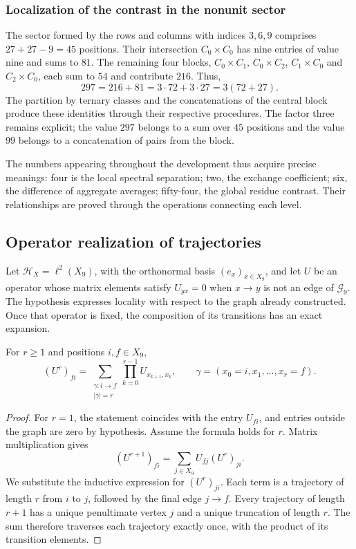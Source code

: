 \subsubsection{Localization of the contrast in the nonunit sector}

The sector formed by the rows and columns with indices $3,6,9$ comprises $27+27-9=45$ positions. Their intersection $C_0\times C_0$ has nine entries of value nine and sums to $81$. The remaining four blocks, $C_0\times C_1$, $C_0\times C_2$, $C_1\times C_0$ and $C_2\times C_0$, each sum to $54$ and contribute $216$. Thus,
\[
 297=216+81=3\cdot72+3\cdot27=3(72+27).
\]
The partition by ternary classes and the concatenations of the central block produce these identities through their respective procedures. The factor three remains explicit; the value $297$ belongs to a sum over $45$ positions and the value $99$ belongs to a concatenation of pairs from the block.

The numbers appearing throughout the development thus acquire precise meanings: four is the local spectral separation; two, the exchange coefficient; six, the difference of aggregate averages; fifty-four, the global residue contrast. Their relationships are proved through the operations connecting each level.

\subsection{Operator realization of trajectories}
\label{geo:operadores-trayectorias}

Let $\mathcal H_X=\ell^2(X_9)$, with the orthonormal basis $(e_x)_{x\in X_9}$, and let $U$ be an operator whose matrix elements satisfy $U_{yx}=0$ when $x\to y$ is not an edge of $\mathscr G_9$. The hypothesis expresses locality with respect to the graph already constructed. Once that operator is fixed, the composition of its transitions has an exact expansion.

\begin{teorema}
\label{geo:thm-expansion}
For $r\geq1$ and positions $i,f\in X_9$,
\[
 (U^r)_{fi}
 =\sum_{\substack{\gamma:i\to f\\|\gamma|=r}}
   \prod_{k=0}^{r-1}U_{x_{k+1},x_k},
 \qquad\gamma=(x_0=i,x_1,\ldots,x_r=f).
\]
\end{teorema}

\begin{proof}
For $r=1$, the statement coincides with the entry $U_{fi}$, and entries outside the graph are zero by hypothesis. Assume the formula holds for $r$. Matrix multiplication gives
\[
 (U^{r+1})_{fi}=\sum_{j\in X_9}U_{fj}(U^r)_{ji}.
\]
We substitute the inductive expression for $(U^r)_{ji}$. Each term is a trajectory of length $r$ from $i$ to $j$, followed by the final edge $j\to f$. Every trajectory of length $r+1$ has a unique penultimate vertex $j$ and a unique truncation of length $r$. The sum therefore traverses each trajectory exactly once, with the product of its transition elements.
\end{proof}

